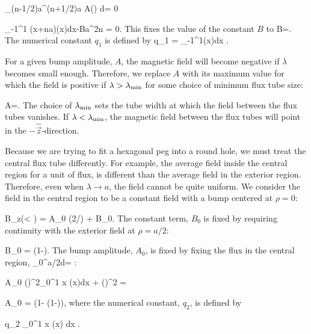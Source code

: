 \be
	\int_{(n-1/2)a}^{(n+1/2)a} \rho A\left(\right)
		 d\rho = 0
\ee

\be
	\int_{-1}^1 \left(x+na\right)\Psi(x)dx-Ba^2n = 0.
\ee
This fixes the value of the constant $B$ to
\be
	B=.
\ee
The numerical constant $q_1$ is defined by
\be
	q_1 = \int_{-1}^{1}\Psi(x)dx .
\ee

For a given bump amplitude, $A$, the magnetic field will become negative if $\lambda$ becomes small enough.
Therefore, we replace $A$ with its maximum value for which the field is positive if $\lambda > \lambda_{\rm min}$
for some choice of minimum flux tube size:

\be
	A=.
\ee
The choice of $\lambda_{\rm min}$ sets the tube width at which the field between the flux tubes vanishes. If 
$\lambda < \lambda_{\rm min}$, the magnetic field between the flux tubes will 
point in the $-\hat{\vec{z}}$-direction.

Because we are trying to fit a hexagonal peg into a round hole, we must treat the central flux tube differently. 
For example, the average field inside the central region for a unit of flux, is different than the average 
field in the exterior region. Therefore, even when $\lambda \rightarrow a$, the field cannot be quite uniform. 
We consider the field in the central region to be a constant field with a bump centered at $\rho = 0$:

\be
	B_z(\rho < ) = A_0 \Psi(2\rho/\lambda) + B_0.
\ee
The constant term, $B_0$ is fixed by requiring continuity with the exterior field at $\rho = a/2$:

\be
	B_0 = \left(1-\right).
\ee
The bump amplitude, $A_0$, is fixed by fixing the flux in the central region,
\be
	\int_0^{a/2}\rho{}d\rho = :
\ee

\be
	A_0 \left(\right)^2\int_0^1 x \Psi(x)dx + 
		\left(\right)^2 = 
\ee

\be
	A_0 = \left(1-
		\left(1-\right)\right),
\ee
where the numerical constant, $q_2$, is defined by

\be
	\label{eqn:q2}
	q_2 \equiv \int_0^1 x \Psi(x) dx .
\ee

